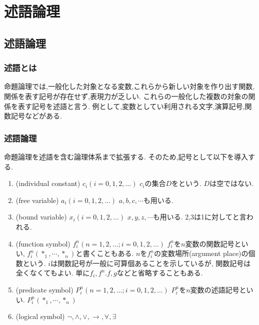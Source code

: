 \chapter{述語論理}
\section{述語論理}

\subsection{述語とは}
命題論理では,一般化した対象となる変数,これらから新しい対象を作り出す関数,
関係を表す記号が存在せず,表現力が乏しい.
これらの一般化した複数の対象の関係を表す記号を述語と言う.
例として,変数としてい利用される文字,演算記号,関数記号などがある.

\subsection{述語論理}
命題論理を述語を含む論理体系まで拡張する. そのため,記号として以下を導入する.
\begin{enumerate}
 \item {}(individual constant) $c_i(i=0,1,2,\dots)$ $c_i$の集合$D$をという. $D$は空ではない.
 \item {}(free variable) $a_i(i=0,1,2,\dots)$ $a,b,c,\cdots$も用いる.
 \item {}(bound variable) $x_i(i=0,1,2,\dots)$ $x,y,z,\cdots$も用いる.
	   2,3は1に対してと言われる.
 \item {}(function symbol) $f_i^n(n=1,2,\dots;i=0,1,2,\dots)$
	   $f_i^n$を$n$変数の関数記号といい, $f_i^n(*_1,\cdots,*_n)$と書くこともある.
	   $n$を$f_i^n$の変数場所(argument place)の個数という.
	   $i$は関数記号が一般に可算個あることを示しているが, 関数記号は全くなくてもよい. 
	   単に$f_i,f^n.f,g$などと省略することもある.
 \item {}(predicate symbol) $P_i^n(n=1,2,\dots;i=0,1,2,\dots)$ $P_i^n$を$n$変数の述語記号といい. $P_i^n(*_1,\cdots,*_n)$
 \item {}(logical symbol) $\lnot,\land,\lor,\to,\forall,\exists$
\end{enumerate}